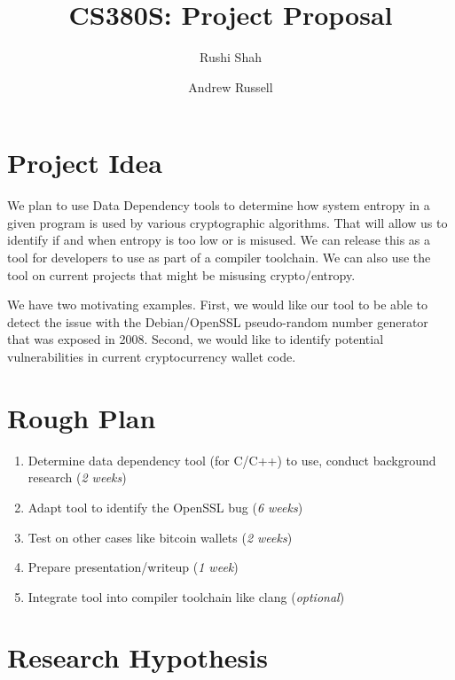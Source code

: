 \documentclass[letterpaper,twocolumn,10pt]{article}
\begin{document}
\date{}

\title{\Large \bf CS380S: Project Proposal}

\author{
{\rm Rushi Shah}
\and
{\rm Andrew Russell}
}

\maketitle

\section{Project Idea}

We plan to use Data Dependency tools to determine how system entropy in a given program is used by various cryptographic algorithms. That will allow us to identify if and when entropy is too low or is misused. We can release this as a tool for developers to use as part of a compiler toolchain. We can also use the tool on current projects that might be misusing crypto/entropy. 

We have two motivating examples. First, we would like our tool to be able to detect the issue with the Debian/OpenSSL pseudo-random number generator that was exposed in 2008. Second, we would like to identify potential vulnerabilities in current cryptocurrency wallet code. 

\section{Rough Plan}

\begin{enumerate}
	\item Determine data dependency tool (for C/C++) to use, conduct background research (\textit{2 weeks})
	\item Adapt tool to identify the OpenSSL bug (\textit{6 weeks})
	\item Test on other cases like bitcoin wallets (\textit{2 weeks})
	\item Prepare presentation/writeup (\textit{1 week})
	\item Integrate tool into compiler toolchain like clang (\textit{optional})
\end{enumerate}

\section{Research Hypothesis}
\end{document}
